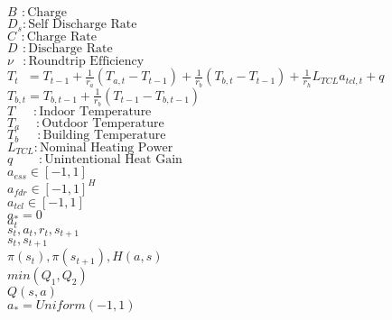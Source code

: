 \documentclass{article}
\begin{document}
\noindent $B\phantom{_s}: \text{Charge}$ \\
$D_s: \text{Self Discharge Rate}$ \\
$C\phantom{_s}: \text{Charge Rate}$ \\
$D\phantom{_s}: \text{Discharge Rate}$ \\
$\nu\phantom{_ls}: \text{Roundtrip Efficiency}$\\
$T_t\phantom{n} = T_{t-1} + \frac{1}{r_a} (T_{a, t} - T_{t-1}) + \frac{1}{r_b} (T_{b,t} - T_{t-1}) + \frac{1}{r_h} L_{TCL} a_{tcl,t} + q$\\
$T_{b, t} = T_{b, t-1} + \frac{1}{r_b} (T_{t-1} - T_{b, t-1})$ \\
$T\phantom{Tlll}: \text{Indoor Temperature}$ \\
$T_a\phantom{Ml}: \text{Outdoor Temperature}$ \\
$T_b\phantom{alll}: \text{Building Temperature}$ \\
$L_{TCL}: \text{Nominal Heating Power}$ \\
$q\phantom{mml}: \text{Unintentional Heat Gain}$ \\
$a_{ess} \in [-1, 1]$\\
$a_{fdr} \in [-1, 1]^H$\\
$a_{tcl} \in [-1, 1]$\\
$a_{*} = 0$ \\
$a_t$\\
$s_t, a_t, r_t, s_{t+1}$ \\
$s_t, s_{t+1}$ \\
$\pi(s_t), \pi(s_{t+1}), H(a, s)$\\
$min(Q_1, Q_2)$\\
$Q(s,a)$ \\
$a_* = Uniform(-1, 1)$
\newpage
\end{document}
